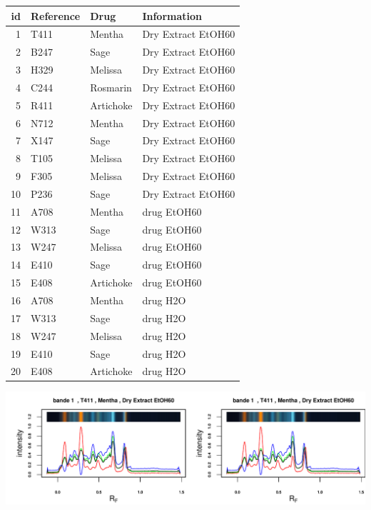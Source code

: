 \documentclass[a4paper]{article}\usepackage[]{graphicx}\usepackage[]{color}
\makeatletter
\def\maxwidth{ %
  \ifdim\Gin@nat@width>\linewidth
    \linewidth
  \else
    \Gin@nat@width
  \fi
}
\newenvironment{knitrout}{}{} %
\makeatother
\begin{document}
\begin{longtable}{rlll}
  \hline
id & Reference & Drug & Information \\ 
  \hline
  1 & T411 & Mentha & Dry Extract EtOH60 \\ 
    2 & B247 & Sage & Dry Extract EtOH60 \\ 
    3 & H329 & Melissa & Dry Extract EtOH60 \\ 
    4 & C244 & Rosmarin & Dry Extract EtOH60 \\ 
    5 & R411 & Artichoke & Dry Extract EtOH60 \\ 
    6 & N712 & Mentha & Dry Extract EtOH60 \\ 
    7 & X147 & Sage & Dry Extract EtOH60 \\ 
    8 & T105 & Melissa & Dry Extract EtOH60 \\ 
    9 & F305 & Melissa & Dry Extract EtOH60 \\ 
   10 & P236 & Sage & Dry Extract EtOH60 \\ 
   11 & A708 & Mentha & drug EtOH60 \\ 
   12 & W313 & Sage & drug EtOH60 \\ 
   13 & W247 & Melissa & drug EtOH60 \\ 
   14 & E410 & Sage & drug EtOH60 \\ 
   15 & E408 & Artichoke & drug EtOH60 \\ 
   16 & A708 & Mentha & drug H2O \\ 
   17 & W313 & Sage & drug H2O \\ 
   18 & W247 & Melissa & drug H2O \\ 
   19 & E410 & Sage & drug H2O \\ 
   20 & E408 & Artichoke & drug H2O \\ 
   \hline
\hline
\end{longtable}



\begin{knitrout}
\color{fgcolor}
\includegraphics[width=\maxwidth]{figure/unnamed-chunk-3-1} 

\end{knitrout}
\end{document}
